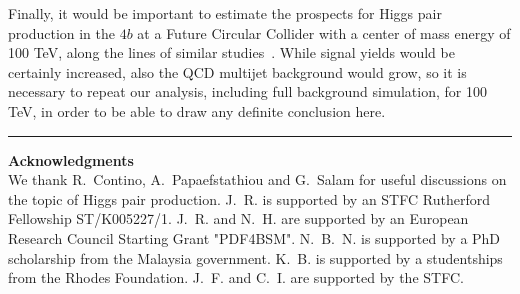 Finally, it would be important to estimate the prospects for
Higgs pair production in the $4b$ at a Future Circular
Collider with a center of mass energy of 100 TeV, along the lines
of similar studies~\cite{Barr:2014sga}.
%
While signal yields would be certainly increased, also the QCD
multijet background would grow, so it is necessary to repeat
our analysis, including full background simulation, for 100 TeV,
in order to be able to draw any definite conclusion here.



\bigskip
\bigskip
\begin{center}
\rule{5cm}{.1pt}
\end{center}
\bigskip
\bigskip

{\bf\noindent  Acknowledgments \\}
We thank R.~Contino, A.~Papaefstathiou and
G.~Salam for useful discussions on the topic
of Higgs pair production.
%
J.~R. is supported by an STFC Rutherford Fellowship ST/K005227/1.
%
J.~R. and N.~H. are
supported by an European Research Council Starting Grant "PDF4BSM".
%
N.~B.~N. is supported by a PhD scholarship from the Malaysia
government.
K.~B. is supported by a studentships from the Rhodes Foundation.
%
J.~F. and C.~I. are supported by the STFC.
